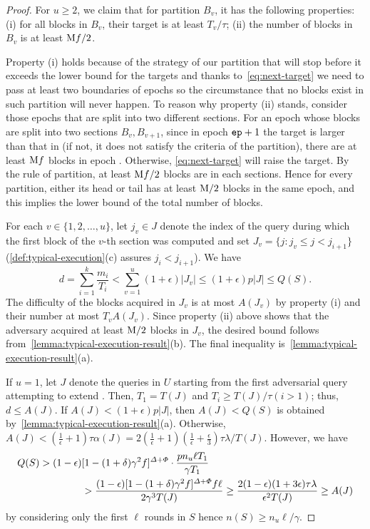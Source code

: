 \begin{proof}
    For $u \ge 2$, we claim that for partition $B_v$, it has the following properties: (i) for all blocks in $B_v$, their target is at least $T_v / \tau$; (ii) the number of blocks in $B_v$ is at least $\mathrm{M} f / 2$.

    Property (i) holds because of the strategy of our partition that will stop before it exceeds the lower bound for the targets and thanks to~\cref{eq:next-target} we need to pass at least two boundaries of epochs so the circumstance that no blocks exist in such partition will never happen.
    To reason why property (ii) stands, consider those epochs that are split into two different sections.
    For an epoch \epoch whose blocks are split into two sections $B_v, B_{v + 1}$, since in epoch $\mathtt{ep} + 1$ the target is larger than that in \epoch (if not, it does not satisfy the criteria of the partition), there are at least $\mathrm{M} f$ blocks in epoch \epoch.
    Otherwise, \cref{eq:next-target} will raise the target.
    By the rule of partition, at least $\mathrm{M} f/ 2$ blocks are in each sections.
    Hence for every partition, either its head or tail has at least $ \mathrm{M} / 2$ blocks in the same epoch, and this implies the lower bound of the total number of blocks.

    For each $v \in \{1, 2, \ldots, u\}$, let $j_v \in J$ denote the index of the query during which the first block of the $v$-th section was computed and set $J_v = \{j : j_v \le j < j_{i + 1} \}$ (\cref{def:typical-execution}(c) assures $j_i < j_{i + 1}$).
    We have
    \[ d = \sum_{i = 1}^k \frac{m_i}{T_i} < \sum_{v = 1}^u (1 + \epsilon) |J_v| \le (1 + \epsilon) p |J| \le Q(S). \]
    The difficulty of the blocks acquired in $J_v$ is at most $A(J_v)$ by property (i) and their number at most $T_v A(J_v)$.
    Since property (ii) above shows that the adversary acquired at least $\mathrm{M} / 2$ blocks in $J_v$, the desired bound follows from~\cref{lemma:typical-execution-result}(b).
    The final inequality is~\cref{lemma:typical-execution-result}(a).

    If $u = 1$, let $J$ denote the queries in $U$ starting from the first adversarial query attempting to extend \block.
    Then, $T_1 = T(J)$ and $T_i \ge T(J) / \tau (i > 1)$; thus, $d \le A(J)$.
    If $A(J) < (1 + \epsilon) p |J|$, then $A(J) < Q(S)$ is obtained by~\cref{lemma:typical-execution-result}(a).
    Otherwise, $A(J) < (\frac{1}{\epsilon} + 1) \tau \alpha(J) = 2(\frac{1}{\epsilon} + 1)(\frac{1}{\epsilon} + \frac{\epsilon}{3}) \tau \lambda / T(J)$.
    However, we have
    \begin{align*}
        Q(S) > (1 - \epsilon) & [1 - (1 + \delta) \gamma^2 f]^{\varDelta + \varPhi} \cdot \frac{p n_u \ell T_1}{\gamma T_1}
        \\
                              & > \frac{(1 - \epsilon)[1 - (1 + \delta) \gamma^2 f]^{\varDelta + \varPhi}  f \ell}{2 \gamma^3 T(J)} \ge \frac{2(1 - \epsilon)(1 + 3\epsilon) \tau \lambda}{\epsilon^2 T(J)} \ge A(J)
    \end{align*}
    by considering only the first $\ell$ rounds in $S$ hence $n(S) \ge n_u \ell / \gamma$.
\end{proof}


